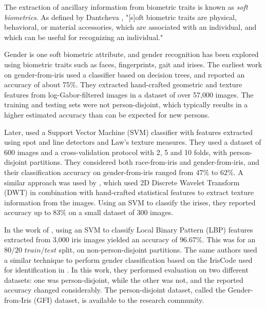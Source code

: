 \documentclass[10pt,twocolumn,letterpaper]{article}
\begin{document}
The extraction of ancillary information from biometric traits is known as \textit{soft biometrics}.  
As defined by Dantcheva \etal \cite{Dantcheva2016}, "[s]oft biometric traits are physical, behavioral, or material accessories, which are associated with an individual, and which can be useful for recognizing an individual."

Gender is one soft biometric attribute, and gender recognition has been explored using  biometric traits such as faces, fingerprints, gait and irises.
The earliest work on gender-from-iris \cite{Thomas2007} used a classifier based on decision trees, and reported an accuracy of about 75\%. 
They extracted hand-crafted geometric and texture features from log-Gabor-filtered images in a dataset of over  57,000 images. 
The training and testing sets were not person-disjoint, which typically results in a higher estimated accuracy than can be expected for new persons.

Later, \cite{Lagree2011PredictingEA} used a Support Vector Machine (SVM) classifier with features extracted using spot and line detectors and Law's texture measures. 
They used a dataset of 600 images and a cross-validation protocol with 2, 5 and 10 folds, with person-disjoint partitions. 
They considered both race-from-iris and gender-from-iris, and their classification accuracy on gender-from-iris ranged from $47\%$ to $62\%$. 
A similar approach was used by \cite{Bansal2012}, which used 2D Discrete Wavelet Transform (DWT) in combination with hand-crafted statistical features to extract texture information from the images.
Using an SVM to classify the irises, they reported accuracy up to $83\%$ on a small dataset of 300 images. 

In the work of \cite{Tapia2014}, using an SVM to classify Local Binary Pattern (LBP) features extracted from 3,000 iris images yielded an accuracy of $96.67\%$. 
This was for an $80/20$ $train/test$ split, on non-person-disjoint partitions. 
The same authors used a similar technique to perform gender classification based on the IrisCode used for identification in \cite{Tapia2016GenderCF}. 
In this work, they performed evaluation on two different datasets: one was person-disjoint, while the other was not, and the reported accuracy changed considerably. 
The person-disjoint dataset, called the Gender-from-Iris (GFI) dataset, is available to the research community.
\end{document}
